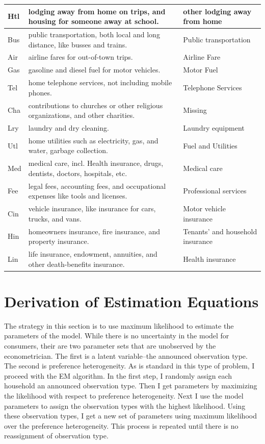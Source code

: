 \documentclass{article}
\begin{document}
\begin{sideways}
\begin{tabular}{|l|l|l|}
\hline
Htl & lodging away from home on trips, and housing for someone away at school. & other lodging away from home\\ 
\hline
Bus & public transportation, both local and long distance, like busses and trains. & Public transportation\\ 
\hline
Air & airline fares for out-of-town trips. & Airline Fare\\ 
\hline
Gas & gasoline and diesel fuel for motor vehicles. & Motor Fuel\\ 
\hline
Tel & home telephone services, not including mobile phones. & Telephone Services\\ 
\hline
Cha & contributions to churches or other religious organizations, and other charities. & Missing\\ 
\hline
Lry & laundry and dry cleaning. & Laundry equipment\\ 
\hline
Utl & home utilities such as electricity, gas, and water, garbage collection. & Fuel and Utilities\\ 
\hline
Med & medical care, incl. Health insurance, drugs, dentists, doctors, hospitals, etc. & Medical care\\ 
\hline
Fee & legal fees, accounting fees, and occupational expenses like tools and licenses. & Professional services\\ 
\hline
Cin & vehicle insurance, like insurance for cars, trucks, and vans. & Motor vehicle insurance\\ 
\hline
Hin & homeowners insurance, fire insurance, and property insurance. & Tenants' and household insurance\\ 
\hline
Lin & life insurance, endowment, annuities, and other death-benefits insurance. & Health insurance\\ 
\hline
\end{tabular}
\end{sideways}

\section{Derivation of Estimation Equations}
The strategy in this section is to use maximum likelihood to estimate the parameters of the model.  
While there is no uncertainty in the model for consumers, their are two parameter sets that are unobserved by the econometrician.
The first is a latent variable--the announced observation type.
The second is preference heterogeneity.
As is standard in this type of problem, I proceed with the EM algorithm.
In the first step, I randomly assign each household an announced observation type.
Then I get parameters by maximizing the likelihood with respect to preference heterogeneity.
Next I use the model parameters to assign the observation types with the highest likelihood.
Using these observation types, I get a new set of parameters using maximum likelihood over the preference heterogeneity.
This process is repeated until there is no reassignment of observation type.
\end{document}
